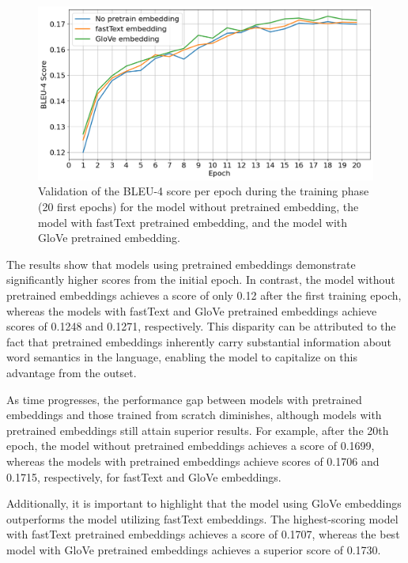 \documentclass[conference]{IEEEtran}
\begin{document}
\begin{figure}[h]
\includegraphics[width=\columnwidth]{assets/metric_compare_train_phase.png}
\caption{Validation of the BLEU-4 score per epoch during the training phase (20 first epochs) for the model without pretrained embedding, the model with fastText pretrained embedding, and the model with GloVe pretrained embedding.}
\label{fig:compare_val_score}
\end{figure}


The results show that models using pretrained embeddings demonstrate significantly higher scores from the initial epoch. In contrast, the model without pretrained embeddings achieves a score of only 0.12 after the first training epoch, whereas the models with fastText and GloVe pretrained embeddings achieve scores of 0.1248 and 0.1271, respectively. This disparity can be attributed to the fact that pretrained embeddings inherently carry substantial information about word semantics in the language, enabling the model to capitalize on this advantage from the outset.


As time progresses, the performance gap between models with pretrained embeddings and those trained from scratch diminishes, although models with pretrained embeddings still attain superior results.  For example, after the 20th epoch, the model without pretrained embeddings achieves a score of 0.1699, whereas the models with pretrained embeddings achieve scores of 0.1706 and 0.1715, respectively, for fastText and GloVe embeddings.


Additionally, it is important to highlight that the model using GloVe embeddings outperforms the model utilizing fastText embeddings. The highest-scoring model with fastText pretrained embeddings achieves a score of 0.1707, whereas the best model with GloVe pretrained embeddings achieves a superior score of 0.1730.
\end{document}
